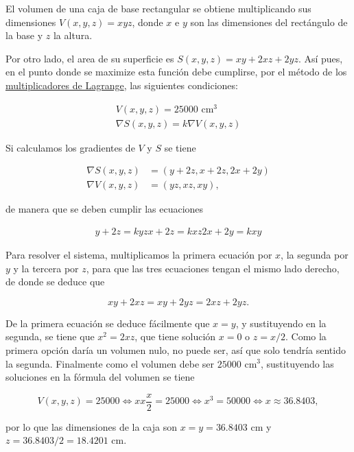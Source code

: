 \documentclass[
  spanish,
  a4paper,
]{scrreport}
\theoremstyle{definition}
\theoremstyle{remark}
\begin{document}
\begin{tcolorbox}[enhanced jigsaw, arc=.35mm, bottomrule=.15mm, bottomtitle=1mm, breakable, colback=white, colbacktitle=quarto-callout-tip-color!10!white, colframe=quarto-callout-tip-color-frame, coltitle=black, left=2mm, leftrule=.75mm, opacityback=0, opacitybacktitle=0.6, rightrule=.15mm, title=\textcolor{quarto-callout-tip-color}{\faLightbulb}\hspace{0.5em}{Solución}, titlerule=0mm, toprule=.15mm, toptitle=1mm]

El volumen de una caja de base rectangular se obtiene multiplicando sus
dimensiones \(V(x, y, z)=xyz\), donde \(x\) e \(y\) son las dimensiones
del rectángulo de la base y \(z\) la altura.

Por otro lado, el area de su superficie es
\(S(x, y, z) = xy + 2xz + 2yz\). Así pues, en el punto donde se maximize
esta función debe cumplirse, por el método de los
\href{https://aprendeconalf.es/analisis-manual/13-derivadas-funciones-varias-variables.html\#multiplicadores-de-lagrange}{multiplicadores
de Lagrange}, las siguientes condiciones:

\[
\begin{gathered}
V(x, y, z) = 25000 \mbox{ cm}^3\\
\nabla S(x,y,z) = k \nabla V(x,y,z)
\end{gathered}
\]

Si calculamos los gradientes de \(V\) y \(S\) se tiene

\begin{align*}
\nabla S(x,y,z) &= (y+2z, x+2z, 2x+2y) \\
\nabla V(x,y,z) &= (yz, xz, xy),
\end{align*}

de manera que se deben cumplir las ecuaciones

\[
\begin{gathered}
y+2z = kyz
x+2z = kxz
2x+2y = kxy
\end{gathered}
\]

Para resolver el sistema, multiplicamos la primera ecuación por \(x\),
la segunda por \(y\) y la tercera por \(z\), para que las tres
ecuaciones tengan el mismo lado derecho, de donde se deduce que

\[
xy + 2xz = xy + 2yz = 2xz + 2yz.
\]

De la primera ecuación se deduce fácilmente que \(x=y\), y sustituyendo
en la segunda, se tiene que \(x^2 = 2xz\), que tiene solución \(x=0\) o
\(z = x/2\). Como la primera opción daría un volumen nulo, no puede ser,
así que solo tendría sentido la segunda. Finalmente como el volumen debe
ser \(25000\) cm\(^3\), sustituyendo las soluciones en la fórmula del
volumen se tiene

\[
V(x,y,z) = 25000 \Leftrightarrow xx\frac{x}{2} = 25000 \Leftrightarrow x^3= 50000 \Leftrightarrow x \approx 36.8403,
\]

por lo que las dimensiones de la caja son \(x=y=36.8403\) cm y
\(z=36.8403/2 = 18.4201\) cm.

\end{tcolorbox}
\end{document}
